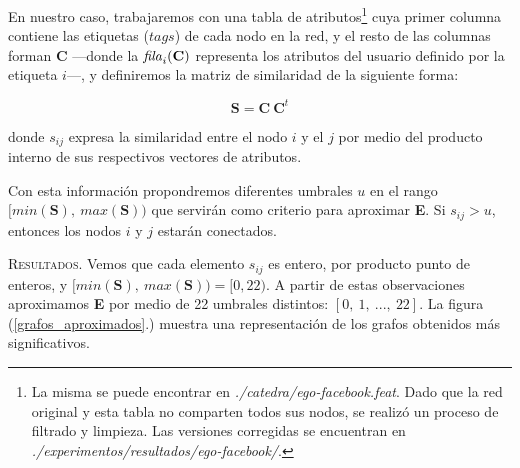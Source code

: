 
\vspace{2em}
En nuestro caso, trabajaremos con una tabla de atributos\footnote{La misma se puede encontrar en \textit{./catedra/ego-facebook.feat}. Dado que la red original y esta tabla no comparten todos sus nodos, se realizó un proceso de filtrado y limpieza. Las versiones corregidas se encuentran en \textit{./experimentos/resultados/ego-facebook/}.} cuya primer columna contiene las etiquetas ($tags$) de cada nodo en la red, y el resto de las columnas forman \textbf{C} ---donde la $\text{\textit{fila}}_i(\textbf{C})$ representa los atributos del usuario definido por la etiqueta $i$---, y definiremos la matriz de similaridad de la siguiente forma:

\vspace{1em}
\begin{equation}
    \mathbf{S} = \mathbf{C}\ \mathbf{C}^{t}
\end{equation}

\vspace{1em}
\noindent donde $s_{ij}$ expresa la similaridad entre el nodo $i$ y el $j$ por medio del producto interno de sus respectivos vectores de atributos. 

\vspace{1em}
Con esta información propondremos diferentes umbrales $u$ en el rango $[min(\mathbf{S}),\ max(\mathbf{S}))$ que servirán como criterio para aproximar \textbf{E}. Si $s_{ij} > u$, entonces los nodos $i$ y $j$ estarán conectados. 


\vspace{2em}
\noindent \textsc{Resultados}. Vemos que cada elemento $s_{ij}$ es entero, por producto punto de enteros, y $[min(\mathbf{S}),\ max(\mathbf{S})) = [0, 22)$. A partir de estas observaciones aproximamos \textbf{E} por medio de 22 umbrales distintos: $[0,\ 1,\ ...,\ 22]$. La figura (\ref{grafos_aproximados}.) muestra una representación de los grafos obtenidos más significativos. 

